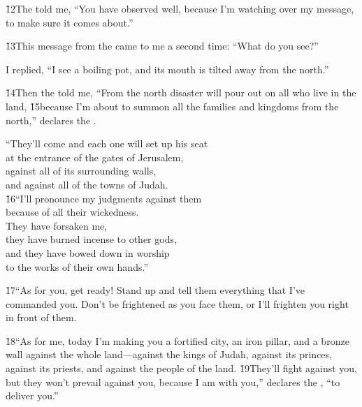 \v{12}The  told me, ``You have observed well, because I'm watching over my message, to make sure it comes about.''

\v{13}This message from the  came to me a second time: ``What do you see?''

I replied, ``I see a boiling pot, and its mouth is tilted away from the north.''

\v{14}Then the  told me, ``From the north disaster will pour out on all who live in the land, \v{15}because I'm about to summon all the families and kingdoms from the north,'' declares the .

\begin{poetry}
\poeml ``They'll come and each one will set up his seat \\
\poemll    at the entrance of the gates of Jerusalem, \\
\poeml against all of its surrounding walls, \\
\poemll    and against all of the towns of Judah. \\
\poeml \v{16}``I'll pronounce my judgments against them \\
\poemll    because of all their wickedness. \\
\poeml They have forsaken me, \\
\poemll    they have burned incense to other gods, \\
\poeml and they have bowed down in worship \\
\poemll    to the works of their own hands.''
\end{poetry}

\v{17}``As for you, get ready! Stand up and tell them everything that I've commanded you. Don't be frightened as you face them, or I'll frighten you right in front of them.

\v{18}``As for me, today I'm making you a fortified city, an iron pillar, and a bronze wall against the whole land---against the kings of Judah, against its princes, against its priests, and against the people of the land. \v{19}They'll fight against you, but they won't prevail against you, because I am with you,'' declares the , ``to deliver you.''

